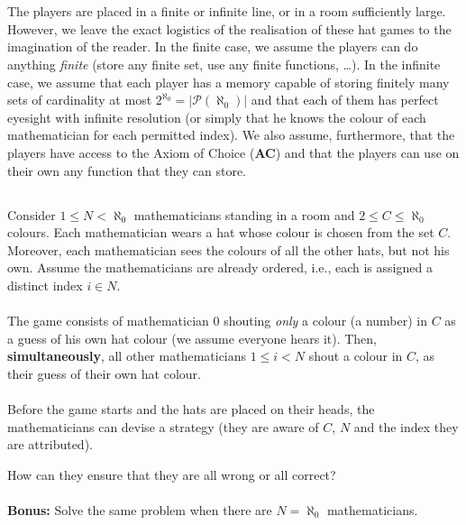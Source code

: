 \documentclass[11pt, a4paper, oneside]{article}
\theoremstyle{remark}
\begin{document}
\\\\
The players are placed in a finite or infinite line, or in a room sufficiently large. However, we leave the exact logistics of the realisation of these hat games to the imagination of the reader. In the finite case, we assume the players can do anything \textit{finite} (store any finite set, use any finite functions, \ldots). In the infinite case, we assume that each player has a memory capable of storing finitely many sets of cardinality at most \( 2^{\aleph_0} = \left|\mathcal{P}\left(\aleph_0\right)\right| \) and that each of them has perfect eyesight with infinite resolution (or simply that he knows the colour of each mathematician for each permitted index). We also assume, furthermore, that the players have access to the Axiom of Choice (\textbf{AC}) and that the players can use on their own any function that they can store.

\subsection{}
Consider \( 1 \leq N < \aleph_0 \) mathematicians standing in a room and \( 2 \leq C \leq \aleph_0 \) colours. Each mathematician wears a hat whose colour is chosen from the set \( C \). Moreover, each mathematician sees the colours of all the other hats, but not his own. Assume the mathematicians are already ordered, i.e., each is assigned a distinct index \( i \in N \).
\\\\
The game consists of mathematician \( 0 \) shouting \textit{only} a colour (a number) in \( C \) as a guess of his own hat colour (we assume everyone hears it). Then, \textbf{simultaneously}, all other mathematicians \( 1 \leq i < N \) shout a colour in \( C \), as their guess of their own hat colour.
\\\\
Before the game starts and the hats are placed on their heads, the mathematicians can devise a strategy (they are aware of $C$, $N$ and the index they are attributed).

How can they ensure that they are all wrong or all correct?
\\\\
\textbf{Bonus:} Solve the same problem when there are \( N = \aleph_0 \) mathematicians.
\end{document}
